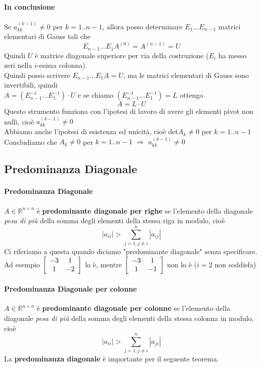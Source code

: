 \documentclass[10pt]{book}
\begin{document}
\paragraph{In conclusione} Se $a_{kk}^{(k-1)} \neq 0$ per $k = 1..n-1$, allora posso determinare $E_1\ldots E_{n-1}$ matrici elementari di Gauss tali che
$$E_{n-1}\ldots E_1 A^{(0)} = A^{(n-1)} = U$$
Quindi $U$ è matrice diagonale superiore per via della costruzione ($E_i$ ha messo zeri nella $i$-esima colonna).\\
Quindi posso scrivere $E_{n-1}\ldots E_1 A = U$, ma le matrici elementari di Gauss sono invertibili, quindi\\
$A = (E_{n-1}^{-1}\ldots E_1^{-1})\cdot U$ e se chiamo $(E_{n-1}^{-1}\ldots E_1^{-1}) = L$ ottengo $$A = L \cdot U$$
Questo strumento funziona con l'ipotesi di lavoro di avere gli elementi pivot non nulli, cioè $a_{kk}^{(k-1)} \neq 0$\\
Abbiamo anche l'ipotesi di esistenza ed unicità, cioè det$A_k \neq 0$ per $k = 1 .. n-1$\\Concludiamo che $A_k \neq 0$ per $k = 1 .. n-1$ $\Rightarrow$ $a_{kk}^{(k-1)} \neq 0$
\subsection{Predominanza Diagonale}
\paragraph{Predominanza Diagonale} $A \in \mathbb{R}^{n \times n}$ è \textbf{predominante diagonale per righe} se l'elemento della diagonale \textit{pesa di più} della somma degli elementi della stessa riga in modulo, cioè $$|a_{ii}| > \sum_{j=1, j \neq i}^n |a_{ij}|$$
Ci riferiamo a questa quando diciamo "predominante diagonale" senza specificare.\\
Ad esempio \begin{math}
\left[ \begin{array}{c c}
-3 & 1 \\
1 & -2
\end{array} \right]
\end{math}
lo è, mentre
\begin{math}
\left[ \begin{array}{c c}
-3 & 1 \\
1 & -1
\end{array} \right]
\end{math}
non lo è ($i = 2$ non soddisfa)
\paragraph{Predominanza Diagonale per colonne} $A \in \mathbb{R}^{n \times n}$ è \textbf{predominante diagonale per colonne} se l'elemento della diagonale \textit{pesa di più} della somma degli elementi della stessa colonna in modulo, cioè $$|a_{ii}| > \sum_{j=1, j \neq i}^n |a_{ji}|$$
La \textbf{predominanza diagonale} è importante per il seguente teorema.
\end{document}
